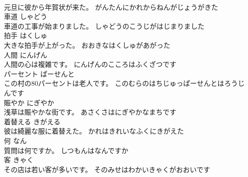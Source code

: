 \documentclass[8pt]{extreport}
\begin{document}
\begin{CJK}{UTF8}{min}
\\	元旦に彼から年賀状が来た。	がんたんにかれからねんがじょうがきた	
\\	車道	しゃどう	
\\	車道の工事が始まりました。	しゃどうのこうじがはじまりました	
\\	拍手	はくしゅ	
\\	大きな拍手が上がった。	おおきなはくしゅがあがった	
\\	人間	にんげん	
\\	人間の心は複雑です。	にんげんのこころはふくざつです	
\\	パーセント	ぱーせんと	
\\	この村の80パーセントは老人です。	このむらのはちじゅっぱーせんとはろうじんです	
\\	賑やか	にぎやか	
\\	浅草は賑やかな街です。	あさくさはにぎやかなまちです	
\\	着替える	きがえる	
\\	彼は綺麗な服に着替えた。	かれはきれいなふくにきがえた	
\\	何	なん	
\\	質問は何ですか。	しつもんはなんですか	
\\	客	きゃく	
\\	その店は若い客が多いです。	そのみせはわかいきゃくがおおいです	
\end{CJK}
\end{document}
